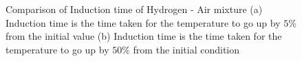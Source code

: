 \documentclass{warpdoc}
\begin{document}
\begin{figure}[!t]
\centering     %
{}
\caption{Comparison of Induction time of Hydrogen - Air mixture (a) Induction time is the time taken for the temperature to go up by $5\%$ from the initial value (b) Induction time is the time taken for the temperature to go up by $50\%$ from the initial condition}
\label{fig:Induction_time_comparison}
\end{figure}






~
\newpage





\end{document}
